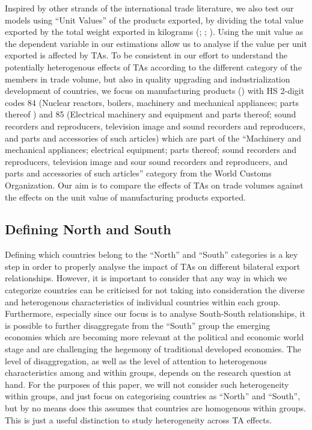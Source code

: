%
Inspired by other strands of the international trade literature, we also
test our models using ``Unit Values'' of the products exported, by
dividing the total value exported by the total weight exported in
kilograms (\cite{latzer_average_2021}; \cite{manova_export_2012}; \cite{bastos_quality_2010}).
 Using the unit value as the dependent variable in our
estimations allow us to analyse if the value per unit exported is
affected by TAs. To be consistent in our effort to understand the
potentially heterogenous effects of TAs according to the different
category of the members in trade volume, but also in quality upgrading
and industrialization development of countries, we focus on
manufacturing products (\cite{chatzilazarou_trade_2023}) with HS 2-digit
codes 84 (Nuclear reactors, boilers, machinery and mechanical
appliances; parts thereof ) and 85 (Electrical machinery and equipment
and parts thereof; sound recorders and reproducers, television image and
sound recorders and reproducers, and parts and accessories of such
articles) which are part of the ``Machinery and mechanical appliances;
electrical equipment; parts thereof; sound recorders and reproducers,
television image and sour sound recorders and reproducers, and parts and
accessories of such articles'' category from the World Customs
Organization. Our aim is to compare the effects of TAs on trade volumes
against the effects on the unit value of manufacturing products
exported.
%
\subsection{Defining North and South}%
\label{subsec:DefiningNorthandSouth}%

%
Defining which countries belong to the ``North'' and ``South''
categories is a key step in order to properly analyse the impact of TAs
on different bilateral export relationships. However, it is important to
consider that any way in which we categorize countries can be criticised
for not taking into consideration the diverse and heterogenous
characteristics of individual countries within each group. Furthermore,
especially since our focus is to analyse South-South relationships, it
is possible to further disaggregate from the ``South'' group the
emerging economies which are becoming more relevant at the political and
economic world stage and are challenging the hegemony of traditional
developed economies. The level of disaggregation, as well as the level
of attention to heterogenous characteristics among and within groups,
depends on the research question at hand. For the purposes of this
paper, we will not consider such heterogeneity within groups, and just
focus on categorising countries as ``North'' and ``South'', but by no
means does this assumes that countries are homogenous within groups.
This is just a useful distinction to study heterogeneity across TA
effects.

